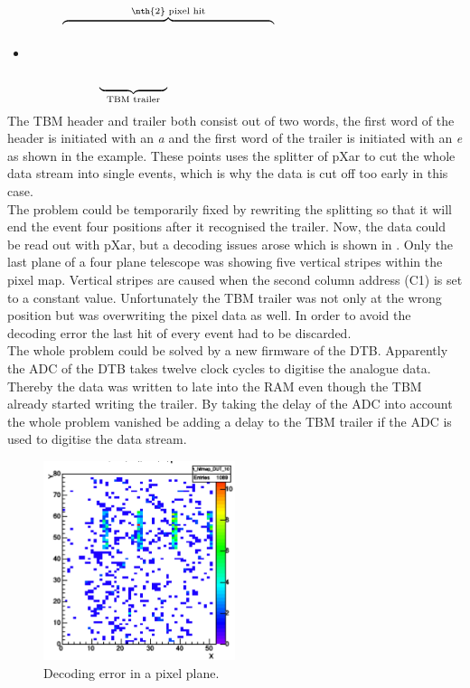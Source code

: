 \documentclass[british,11pt,a4paper]{memoir}
\begin{document}
\termi{[a019 8001 8f3e 0006 006e 0fd8 0007 0fd3 00d5 00ad 0092}
\begin{equation*}
	\overbrace{\hspace*{5.9cm}}^{\z{\nth{2} pixel hit}}\hspace*{3.7cm}
\end{equation*}
\vspace*{-1.0cm}
\begin{itemize}
 \item[] \terminal{$\hdots$ 0fd4 e000 c001 0077 0044 409e]} 
\end{itemize}
\vspace*{-0.5cm}
\begin{equation*}
	\underbrace{\hspace*{1.9cm}}_{\z{TBM trailer}}\hspace*{5.7cm}
\end{equation*}
The \ac{TBM} header and trailer both consist out of two words, the first word of the header is initiated with an \textit{a} and the first word of the trailer is initiated with an \textit{e} as shown in the example. These points uses the splitter of pXar to cut the whole data stream into single events, which is why the data is cut off too early in this case.\\
The problem could be temporarily fixed by rewriting the splitting so that it will end the event four positions after it recognised the trailer. Now, the data could be read out with pXar, but a decoding issues arose which is shown in . Only the last plane of a four plane telescope was showing five vertical stripes within the pixel map. Vertical stripes are caused when the second column address (C1) is set to a constant value. Unfortunately the \ac{TBM} trailer was not only at the wrong position but was overwriting the pixel data as well. In order to avoid the decoding error the last hit of every event had to be discarded.\\
The whole problem could be solved by a new firmware of the \ac{DTB}. Apparently the \ac{ADC} of the \ac{DTB} takes twelve clock cycles to digitise the analogue data. Thereby the data was written to late into the \ac{RAM} even though the \ac{TBM} already started writing the trailer. By taking the delay of the \ac{ADC} into account the whole problem vanished be adding a delay to the \ac{TBM} trailer if the \ac{ADC} is used to digitise the data stream.
\begin{figure}[ht]
	\centering
	\includegraphics[width=0.5\textwidth]{decodingerr}
	\caption{Decoding error in a pixel plane.}
	\label{pdecerr}
\end{figure}\no
\end{document}
